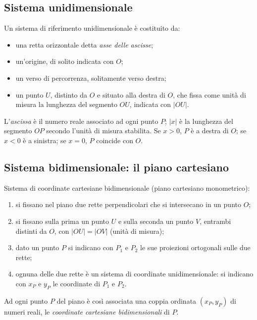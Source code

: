 \documentclass[11pt,a4paper]{article}
\begin{document}
\subsection{Sistema unidimensionale}

Un sistema di riferimento unidimensionale è costituito da:
\begin{itemize}
    \item una retta orizzontale detta \emph{asse delle ascisse};
    \item un'origine, di solito indicata con $O$;
    \item un verso di percorrenza, solitamente verso destra;
    \item un punto $U$, distinto da $O$ e situato alla destra di $O$, che fissa come unità di misura la lunghezza del segmento $OU$, indicata con $|OU|$.
\end{itemize}
L'\emph{ascissa} è il numero reale associato ad ogni punto $P$; $|x|$ è la lunghezza del segmento $OP$ secondo l'unità di misura stabilita. Se $x > 0$, $P$ è a destra di $O$; se $x < 0$ è a sinistra; se $x = 0$, $P$ coincide con $O$.

\begin{center}
\end{center}

\subsection{Sistema bidimensionale: il piano cartesiano}

Sistema di coordinate cartesiane bidimensionale (piano cartesiano monometrico):
\begin{enumerate}
    \item si fissano nel piano due rette perpendicolari che si intersecano in un punto $O$;
    \item si fissano sulla prima un punto $U$ e sulla seconda un punto $V$, entrambi distinti da $O$, con $|OU| = |OV|$ (unità di misura);
    \item dato un punto $P$ si indicano con $P_1$ e $P_2$ le sue proiezioni ortogonali sulle due rette;
    \item ognuna delle due rette è un sistema di coordinate unidimensionale: si indicano con $x_P$ e $y_P$ le coordinate di $P_1$ e $P_2$.
\end{enumerate}
Ad ogni punto $P$ del piano è così associata una coppia ordinata $(x_P, y_P)$ di numeri reali, le \emph{coordinate cartesiane bidimensionali} di $P$.
\end{document}
